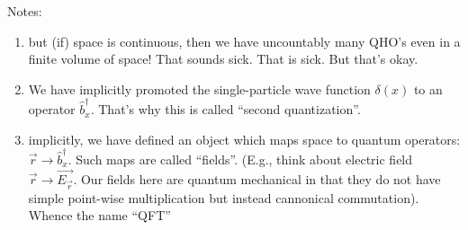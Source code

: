 Notes:
\begin{enumerate}
    \item but (if) space is continuous, then we have uncountably many QHO's even in a finite volume of space! That sounds sick. That is sick. But that's okay.
    \item We have implicitly promoted the single-particle wave function $\delta(x)$ to an operator $\hat{b}_x^\dagger$. That's why this is called ``second quantization''.
    \item implicitly, we have defined an object which maps space to quantum operators: $\vec{r}\to \hat{b}_x^\dagger$. Such maps are called ``fields''. (E.g., think about electric field $\vec{r}\to \vec{E_{\vec{r}}}$. Our fields here are quantum mechanical in that they do not have simple point-wise multiplication but instead cannonical commutation). Whence the name ``QFT''
\end{enumerate}

